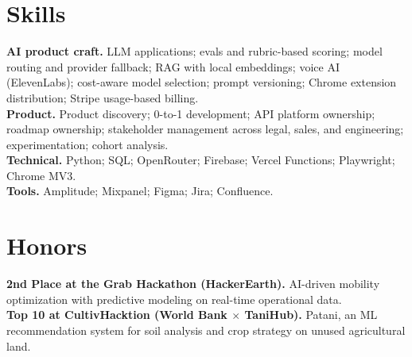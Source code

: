 \documentclass[11pt,a4paper]{article}
\begin{document}
\section*{Skills}

\noindent\textbf{AI product craft.} LLM applications; evals and rubric-based scoring; model routing and provider fallback; RAG with local embeddings; voice AI (ElevenLabs); cost-aware model selection; prompt versioning; Chrome extension distribution; Stripe usage-based billing.\\[0.3em]
\noindent\textbf{Product.} Product discovery; 0-to-1 development; API platform ownership; roadmap ownership; stakeholder management across legal, sales, and engineering; experimentation; cohort analysis.\\[0.3em]
\noindent\textbf{Technical.} Python; SQL; OpenRouter; Firebase; Vercel Functions; Playwright; Chrome MV3.\\[0.3em]
\noindent\textbf{Tools.} Amplitude; Mixpanel; Figma; Jira; Confluence.

\section*{Honors}

\noindent\textbf{2nd Place at the Grab Hackathon (HackerEarth).} AI-driven mobility optimization with predictive modeling on real-time operational data.\\[0.3em]
\noindent\textbf{Top 10 at CultivHacktion (World Bank $\times$ TaniHub).} Patani, an ML recommendation system for soil analysis and crop strategy on unused agricultural land.
\end{document}
